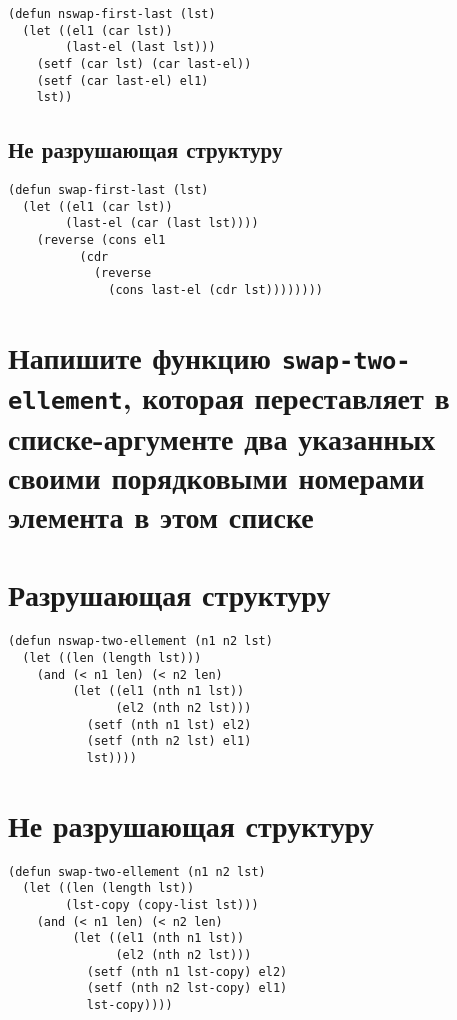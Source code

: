 \begin{lstlisting}
(defun nswap-first-last (lst)
  (let ((el1 (car lst))
        (last-el (last lst)))
    (setf (car lst) (car last-el))
    (setf (car last-el) el1)
    lst))
\end{lstlisting}

\subsection{Не разрушающая структуру}

\begin{lstlisting}
(defun swap-first-last (lst)
  (let ((el1 (car lst))
        (last-el (car (last lst))))
    (reverse (cons el1 
          (cdr 
            (reverse 
              (cons last-el (cdr lst))))))))
\end{lstlisting}

\section{Напишите функцию \texttt{swap-two-ellement}, которая переставляет в списке-аргументе два указанных своими порядковыми номерами элемента в этом списке}

\section{Разрушающая структуру}

\begin{lstlisting}
(defun nswap-two-ellement (n1 n2 lst)
  (let ((len (length lst)))
    (and (< n1 len) (< n2 len)
         (let ((el1 (nth n1 lst))
               (el2 (nth n2 lst)))
           (setf (nth n1 lst) el2)
           (setf (nth n2 lst) el1)
           lst))))
\end{lstlisting}

\section{Не разрушающая структуру}

\begin{lstlisting}
(defun swap-two-ellement (n1 n2 lst)
  (let ((len (length lst))
        (lst-copy (copy-list lst)))
    (and (< n1 len) (< n2 len)
         (let ((el1 (nth n1 lst))
               (el2 (nth n2 lst)))
           (setf (nth n1 lst-copy) el2)
           (setf (nth n2 lst-copy) el1)
           lst-copy))))
\end{lstlisting}

